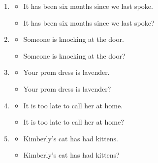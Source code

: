 \documentclass[12pt]{article}
\begin{document}
\begin{enumerate}
\item
\begin{itemize}
\item It has been six months since we last spoke.
\item It has been six months since we last spoke?
\end{itemize}

\item 
\begin{itemize}
\item Someone is knocking at the door.
\item Someone is knocking at the door?
\end{itemize}

\item 
\begin{itemize}
\item Your prom dress is lavender.
\item Your prom dress is lavender?
\end{itemize}

\item 
\begin{itemize}
\item It is too late to call her at home.
\item It is too late to call her at home?
\end{itemize}

\item 
\begin{itemize}
\item Kimberly's cat has had kittens.
\item Kimberly's cat has had kittens?
\end{itemize}
\end{enumerate}

\pagebreak
\end{document}

